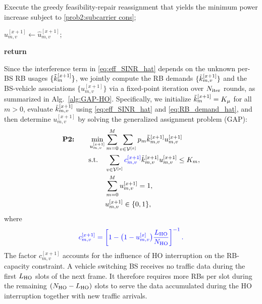 \documentclass[conference, a4paper]{IEEEtran}
\newcommand{\rev}[1]{\textcolor{revisioncolor}{{}#1}}
\theoremstyle{remark}
\begin{document}
\begin{algorithm}[htbp]
\begin{algorithmic}[1]
        
            \STATE Execute the greedy feasibility-repair reassignment that yields the minimum power increase\rev{ subject to \eqref{prob2:subcarrier cons}};
        \ENDWHILE

        \STATE $u_{m,v}^{[x+1]} \leftarrow \hat{u}_{m,v}^{[x+1]}$;

        \STATE \textbf{return}
    \end{algorithmic}
\end{algorithm}


Since the interference term in \eqref{eq:eff_SINR_hat} depends on the unknown per-BS RB usages $\{\Tilde{k}_{m}^{[x+1]}\}$, we jointly compute the RB demands $\{\Tilde{k}_{m,v}^{[x+1]}\}$ and the BS-vehicle associations $\{u_{m,v}^{[x+1]}\}$ via a fixed-point iteration \rev{over $N_{\rm iter}$ rounds}, as summarized in Alg.~\ref{alg:GAP-HO}. Specifically, we initialize $\Tilde{k}_{m}^{[x+1]}=K_\mu$ for all $m>0$, evaluate $\Tilde{k}_{m,v}^{[x+1]}$ using \eqref{eq:eff_SINR_hat} and \eqref{eq:RB_demand_hat}, and then determine $u_{m,v}^{[x+1]}$ by solving the generalized assignment problem (GAP):
\begin{align}
    \label{prob2}
    \textbf{P2:} \qquad  \min_{u_{m,v}^{[x+1]}} & \sum_{m=0}^M \sum_{v\in\mathcal{V}^{[x]}} p_m  \Tilde{k}_{m,v}^{[x+1]} u_{m,v}^{[x+1]} \\
    \textup{s.t.} \quad 
    & \sum_{v \in \mathcal{V}^{[x]}} \rev{c_{m,v}^{[x+1]}}\Tilde{k}_{m,v}^{[x+1]} u_{m,v}^{[x+1]} \leq K_m,
    \label{prob2:subcarrier cons}\\
    & \sum_{m=0}^{M} u_{m,v}^{[x+1]} = 1,
    \label{prob2:connection cons} \\
    & u_{m,v}^{[x+1]} \in \{0,1\},
    \label{prob2:u cons} 
\end{align}
where
\begin{equation}
    \rev{c_{m,v}^{[x+1]}=
    \left[1-\bigl(1-u_{m,v}^{[x]}\bigr)
    \frac{L_{\rm HO}}{N_{\rm HO}}\right]^{-1}.}
    \label{eq:HO_capacity_factor}
\end{equation}
\rev{The factor $c_{m,v}^{[x+1]}$ accounts for the influence of HO interruption on the RB-capacity constraint. A vehicle switching BS receives no traffic data during the first $L_{\rm HO}$ slots of the next frame. It therefore requires more RBs per slot during the remaining $(N_{\rm HO}-L_{\rm HO})$ slots to serve the data accumulated during the HO interruption together with new traffic arrivals.}
\end{document}
